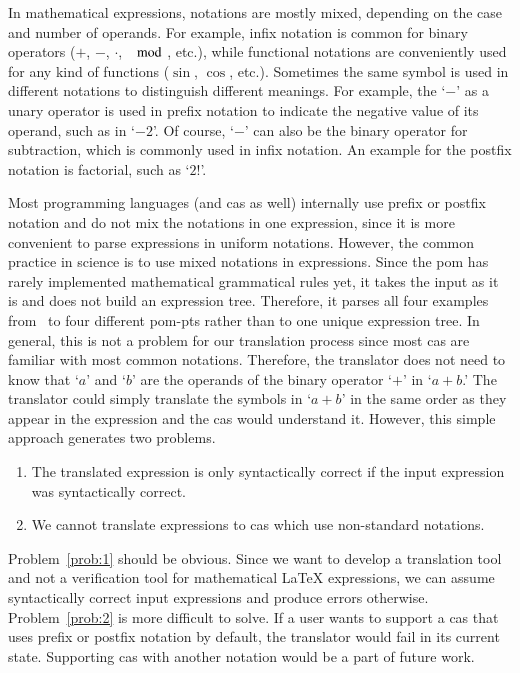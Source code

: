 \documentclass[a4paper,11pt]{article}
\theoremstyle{defTheoStyle}
\theoremstyle{defExampStyle}
\begin{document}
In mathematical expressions, notations are mostly mixed, depending on the case and number of operands. For example, infix notation is common for binary operators ($+$, $-$, $\cdot$, $\mod$, etc.), while functional notations are conveniently used for any kind of functions ($\sin$, $\cos$, etc.). Sometimes the same symbol is used in different notations to distinguish different meanings. For example, the `$-$' as a unary operator is used in prefix notation to indicate the negative value of its operand, such as in `$-2$'. Of course, `$-$' can also be the binary operator for subtraction, which is commonly used in infix notation. An example for the postfix notation is factorial, such as `$2!$'.

Most programming languages (and \gls*{cas} as well) internally use prefix or postfix notation and do not mix the notations in one expression, since it is more convenient to parse expressions in uniform notations. However, the common practice in science is to use mixed notations in expressions. Since the \gls*{pom} has rarely implemented mathematical grammatical rules yet, it takes the input as it is and does not build an expression tree. Therefore, it parses all four examples from~ to four different \gls*{pom-pt}s rather than to one unique expression tree. In general, this is not a problem for our translation process since most \gls*{cas} are familiar with most common notations. Therefore, the translator does not need to know that `$a$' and `$b$' are the operands of the binary operator `$+$' in `$a+b$.' The translator could simply translate the symbols in `$a+b$' in the same order as they appear in the expression and the \gls*{cas} would understand it. However, this simple approach generates two problems.
\begin{enumerate}\item \label{prob:1} The translated expression is only syntactically correct if the input expression was syntactically correct.
\item \label{prob:2} We cannot translate expressions to \gls*{cas} which use non-standard notations.
\end{enumerate}

Problem~\ref{prob:1} should be obvious. Since we want to develop a translation tool and not a verification tool for mathematical \LaTeX{} expressions, we can assume syntactically correct input expressions and produce errors otherwise. Problem~\ref{prob:2} is more difficult to solve. If a user wants to support a \gls*{cas} that uses prefix or postfix notation by default, the translator would fail in its current state. Supporting \gls*{cas} with another notation would be a part of future work.
\end{document}
